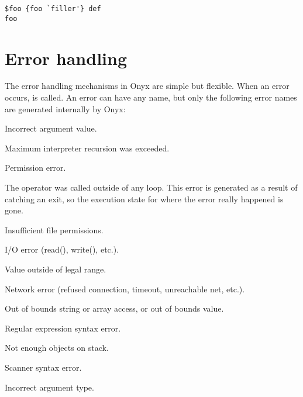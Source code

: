 \begin{verbatim}
$foo {foo `filler'} def
foo
\end{verbatim}

\section{Error handling}

The error handling mechanisms in Onyx are simple but flexible.  When an error
occurs,  is called.  An error can
have any name, but only the following error names are generated internally by
Onyx:
\begin{description}
\label{argcheck}
\item[argcheck: ] Incorrect argument value.
\label{estackoverflow}
\item[estackoverflow: ] Maximum interpreter recursion was exceeded.
\label{invalidaccess}
\item[invalidaccess: ] Permission error.
\label{invalidexit}
\item[invalidexit: ] The  operator was called outside of any
loop.  This error is generated as a result of catching an exit, so the execution
state for where the error really happened is gone.
\label{invalidfileaccess}
\item[invalidfileaccess: ] Insufficient file permissions.
\label{ioerror}
\item[ioerror: ] I/O error (read(), write(), etc.).
\label{limitcheck}
\item[limitcheck: ] Value outside of legal range.
\label{neterror}
\item[neterror: ] Network error (refused connection, timeout, unreachable net,
etc.).
\label{rangecheck}
\item[rangecheck: ] Out of bounds string or array access, or out of bounds
value.
\label{regexerror}
\item[regexerror: ] Regular expression syntax error.
\label{stackunderflow}
\item[stackunderflow: ] Not enough objects on stack.
\label{syntaxerror}
\item[syntaxerror: ] Scanner syntax error.
\label{typecheck}
\item[typecheck: ] Incorrect argument type.

\end{description}
